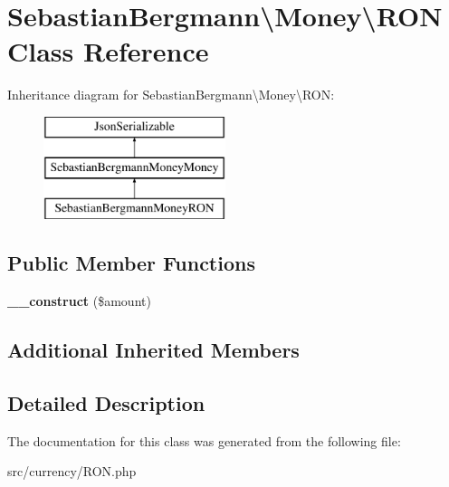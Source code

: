 \hypertarget{classSebastianBergmann_1_1Money_1_1RON}{}\section{Sebastian\+Bergmann\textbackslash{}Money\textbackslash{}R\+O\+N Class Reference}
\label{classSebastianBergmann_1_1Money_1_1RON}
Inheritance diagram for Sebastian\+Bergmann\textbackslash{}Money\textbackslash{}R\+O\+N\+:\begin{figure}[H]
\begin{center}
\leavevmode
\includegraphics[height=3.000000cm]{classSebastianBergmann_1_1Money_1_1RON}
\end{center}
\end{figure}
\subsection*{Public Member Functions}
\begin{DoxyCompactItemize}
\item 
\hypertarget{classSebastianBergmann_1_1Money_1_1RON_a5b9e2b2a7329c567b740d5b819f32440}{}{\bfseries \+\_\+\+\_\+construct} (\$amount)\label{classSebastianBergmann_1_1Money_1_1RON_a5b9e2b2a7329c567b740d5b819f32440}

\end{DoxyCompactItemize}
\subsection*{Additional Inherited Members}


\subsection{Detailed Description}


The documentation for this class was generated from the following file\+:\begin{DoxyCompactItemize}
\item 
src/currency/R\+O\+N.\+php\end{DoxyCompactItemize}
